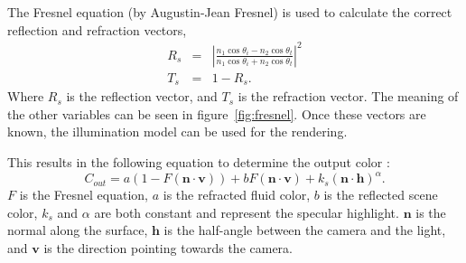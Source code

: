The Fresnel equation (by Augustin-Jean Fresnel) is used to calculate the correct reflection and refraction vectors,
\begin{eqnarray}
	R_s &=& \left\vert \frac{n_1 \cos \theta_i - n_2 \cos \theta_t}{n_1 \cos \theta_i + n_2 \cos \theta_t} \right\vert ^2 \\
	T_s &=& 1 - R_s.
\end{eqnarray}
Where $R_s$ is the reflection vector, and $T_s$ is the refraction vector.
The meaning of the other variables can be seen in figure~\ref{fig:fresnel}.
Once these vectors are known, the \cite{phong1975illumination} illumination model can be used for the rendering.

This results in the following equation to determine the output color \cite{van2009screen}:
\begin{equation}
\label{eq:shading}
C_{out} = a(1 - F(\mathbf{n} \cdot \mathbf{v})) + bF(\mathbf{n} \cdot \mathbf{v}) + k_s(\mathbf{n} \cdot \mathbf{h})^\alpha.
\end{equation}
$F$ is the Fresnel equation, $a$ is the refracted fluid color, $b$ is the reflected scene color, $k_s$ and $\alpha$ are both constant and represent the specular highlight. $\mathbf{n}$ is the normal along the surface, $\mathbf{h}$ is the half-angle between the camera and the light, and $\mathbf{v}$ is the direction pointing towards the camera.
